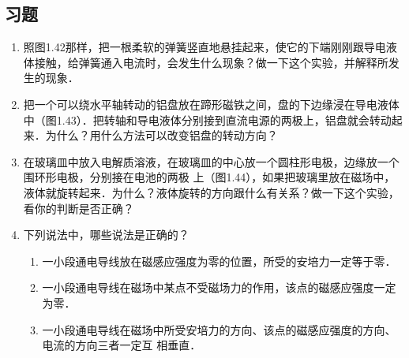 \subsection{习题}
\begin{enumerate}
    \item 照图1.42那样，把一根柔软的弹簧竖直地悬挂起来，使它的下端刚刚跟导电液体接触，给弹簧通入电流时，会发生什么现象？做一下这个实验，并解释所发生的现象．

\begin{figure}[htp]
\centering
\begin{minipage}[t]{0.48\textwidth}
\centering
\caption{}
\end{minipage}
\begin{minipage}[t]{0.48\textwidth}
\centering
\caption{}
\end{minipage}
\end{figure}



\begin{solution}

\end{solution}

    \item 把一个可以绕水平轴转动的铝盘放在蹄形磁铁之间，盘的下边缘浸在导电液体中（图1.43）．把转轴和导电液体分别接到直流电源的两极上，铝盘就会转动起来．为什么？用什么方法可以改变铝盘的转动方向？


    \begin{solution}
    
    \end{solution}
    
\item 在玻璃皿中放入电解质溶液，在玻璃皿的中心放一个圆柱形电极，边缘放一个围环形电极，分别接在电池的两极
上（图1.44），如果把玻璃里放在磁场中，液体就旋转起来．为什么？液体旋转的方向跟什么有关系？做一下这个实验，看你的判断是否正确？
\begin{figure}[htp]\centering
	\caption{ }
\end{figure}


\begin{solution}

\end{solution}

\item 下列说法中，哪些说法是正确的？
\begin{enumerate}
    \item 一小段通电导线放在磁感应强度为零的位置，所受的安培力一定等于零．
    \item 一小段通电导线在磁场中某点不受磁场力的作用，该点的磁感应强度一定为零．
    \item 一小段通电导线在磁场中所受安培力的方向、该点的磁感应强度的方向、电流的方向三者一定互
相垂直．
\end{enumerate}




\end{enumerate}
